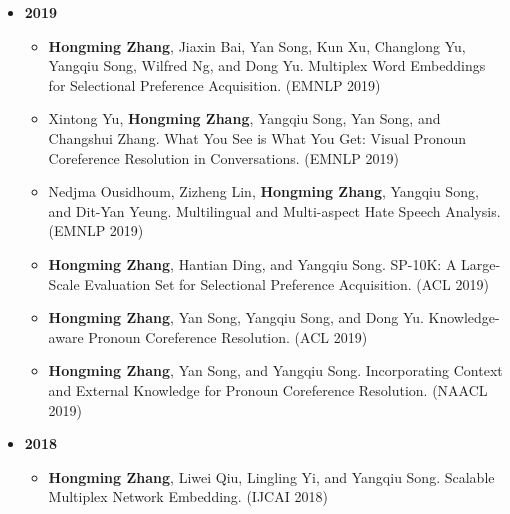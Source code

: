 \begin{itemize}[leftmargin=*, itemsep=0.35em, topsep=0.2em]
  \item[] \textbf{2019}
  \begin{itemize}[leftmargin=1.5em, itemsep=0.2em, topsep=0.1em]
    \item \textbf{Hongming Zhang}, Jiaxin Bai, Yan Song, Kun Xu, Changlong Yu, Yangqiu Song, Wilfred Ng, and Dong Yu. Multiplex Word Embeddings for Selectional Preference Acquisition. (EMNLP 2019)
    \item Xintong Yu, \textbf{Hongming Zhang}, Yangqiu Song, Yan Song, and Changshui Zhang. What You See is What You Get: Visual Pronoun Coreference Resolution in Conversations. (EMNLP 2019)
    \item Nedjma Ousidhoum, Zizheng Lin, \textbf{Hongming Zhang}, Yangqiu Song, and Dit-Yan Yeung. Multilingual and Multi-aspect Hate Speech Analysis. (EMNLP 2019)
    \item \textbf{Hongming Zhang}, Hantian Ding, and Yangqiu Song. SP-10K: A Large-Scale Evaluation Set for Selectional Preference Acquisition. (ACL 2019)
    \item \textbf{Hongming Zhang}, Yan Song, Yangqiu Song, and Dong Yu. Knowledge-aware Pronoun Coreference Resolution. (ACL 2019)
    \item \textbf{Hongming Zhang}, Yan Song, and Yangqiu Song. Incorporating Context and External Knowledge for Pronoun Coreference Resolution. (NAACL 2019)
  \end{itemize}

  \item[] \textbf{2018}
  \begin{itemize}[leftmargin=1.5em, itemsep=0.2em, topsep=0.1em]
    \item \textbf{Hongming Zhang}, Liwei Qiu, Lingling Yi, and Yangqiu Song. Scalable Multiplex Network Embedding. (IJCAI 2018)
  \end{itemize}
\end{itemize}
\endgroup
